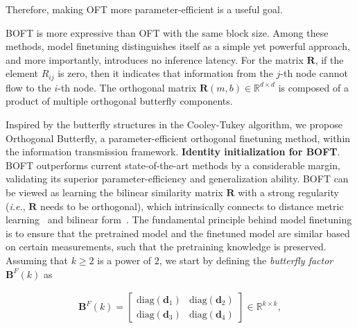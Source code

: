     \!\!\!\!\! Therefore, making OFT more parameter-efficient is a useful goal. \begin{theorem}\label{thm:exp_boft}
    BOFT is more expressive than OFT with the same block size. Among these methods, model finetuning distinguishes itself as a simple yet powerful approach, and more importantly, introduces no inference latency. For the matrix $\bm{R}$, if the element $R_{ij}$ is zero, then it indicates that information from the $j$-th node cannot flow to the $i$-th node. The orthogonal matrix $\bm{R}(m,b)\in\mathbb{R}^{d\times d}$ is composed of a product of multiple orthogonal butterfly components. \item Inspired by the butterfly structures in the Cooley-Tukey algorithm, we propose Orthogonal Butterfly, a parameter-efficient orthogonal finetuning method, within the information transmission framework. \textbf{Identity initialization for BOFT}. BOFT outperforms current state-of-the-art methods by a considerable margin, validating its superior parameter-efficiency and generalization ability. BOFT can be viewed as learning the bilinear similarity matrix $\bm{R}$ with a strong regularity (\emph{i.e.}, $\bm{R}$ needs to be orthogonal), which intrinsically connects to distance metric learning~\cite{xing2002distance} and bilinear form~\cite{roman2005advanced}. The fundamental principle behind model finetuning is to ensure that the pretrained model and the finetuned model are similar based on certain measurements, such that the pretraining knowledge is preserved. Assuming that $k\geq 2$ is a power of $2$, we start by defining the \emph{butterfly factor} $\bm{B}^F(k)$ as

\begin{equation}\label{eq:but_factor}
\begin{aligned}
    \bm{B}^F(k)=\begin{bmatrix}
    \text{diag}(\bm{d}_1) & \text{diag}(\bm{d}_2) \\
    \text{diag}(\bm{d}_3) & \text{diag}(\bm{d}_4)
    \end{bmatrix}\in\mathbb{R}^{k\times k},
\end{aligned}
\end{equation}


\end{theorem}
